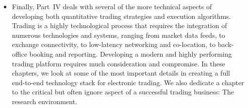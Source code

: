 \begin{itemize}
\item Finally, Part~IV deals with several of the more technical aspects of developing both quantitative trading strategies and execution algorithms. Trading is a highly technological process that requires the integration of numerous technologies and systems,  ranging from market data feeds, to exchange connectivity, to low-latency networking and co-location, to back-office booking and reporting. Developing a modern and highly performing trading platform requires much consideration and compromise. In these chapters, we look at some of the most important details in creating a full end-to-end technology stack for electronic trading. We also dedicate a chapter to the critical but often ignore aspect of a successful trading business: The research environment.
\end{itemize} 